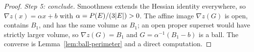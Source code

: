 \begin{proof}
\emph{Step 5: conclude.}  Smoothness extends the Hessian identity everywhere,
so $\nabla z(x)=\alpha x+b$ with $\alpha=P(E)/(3|E|)>0$.  The affine image
$\nabla z(G)$ is open, contains $B_1$, and has the same volume as $B_1$; an
open proper superset would have strictly larger volume, so
$\nabla z(G)=B_1$ and $G=\alpha^{-1}(B_1-b)$ is a ball.  The converse is
Lemma~\ref{lem:ball-perimeter} and a direct computation.
\end{proof}

